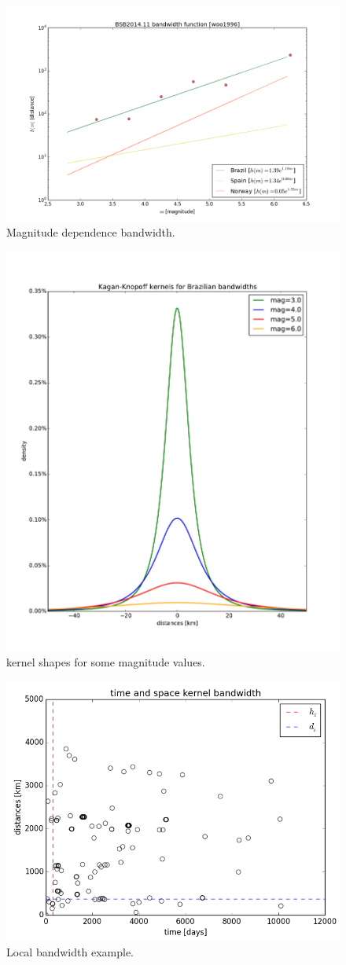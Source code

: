 \documentclass[draft, grl]{agutex}
\begin{document}


\begin{figure}
	\includegraphics[width=0.4\linewidth]{z_img_woo_bandwidth}
	\caption{Magnitude dependence bandwidth.}
	\label{fig_woo_bandwidth}
\end{figure}


\begin{figure}
	\includegraphics[width=0.4\linewidth]{z_img_woo_kernels}
	\caption{\citet{kagan_knopoff_1980} kernel shapes for some magnitude values.}
	\label{fig_woo_kernels}
\end{figure}





\begin{figure}
	\includegraphics[width=0.4\linewidth]{z_img_helmstetter_hidi}
	\caption{Local bandwidth example.}
	\label{fig_helmstetter_hidi}
\end{figure}

\end{document}
